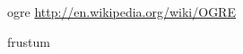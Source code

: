 \begin{thebibliography}{10}
ogre
 \url{http://en.wikipedia.org/wiki/OGRE}


frustum


%
%
%




\end{thebibliography}
